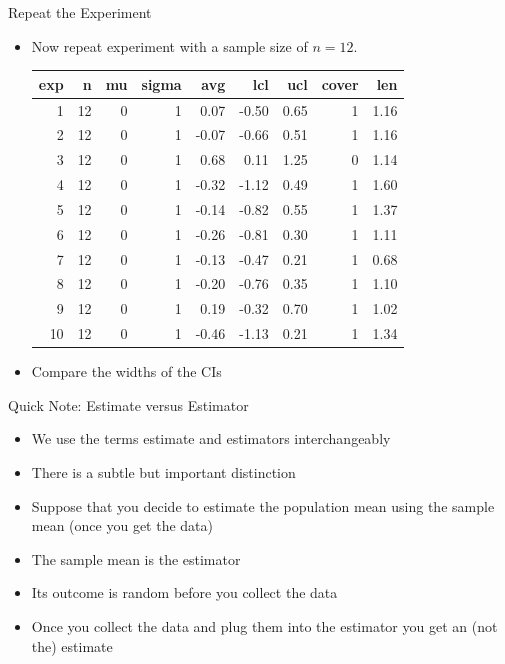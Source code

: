 \documentclass[xcolor=x11names,compress]{beamer}\usepackage[]{graphicx}\usepackage[]{color}
\newenvironment{knitrout}{}{} %
\begin{document}
\begin{frame}{Repeat the Experiment}

  
  \begin{itemize}
  \item Now repeat experiment with a sample size of
    $n=12$.
\begin{knitrout}\tiny
{}\color{fgcolor}
\begin{tabular}{r|r|r|r|r|r|r|r|r}
\hline
exp & n & mu & sigma & avg & lcl & ucl & cover & len\\
\hline
1 & 12 & 0 & 1 & 0.07 & -0.50 & 0.65 & 1 & 1.16\\
\hline
2 & 12 & 0 & 1 & -0.07 & -0.66 & 0.51 & 1 & 1.16\\
\hline
3 & 12 & 0 & 1 & 0.68 & 0.11 & 1.25 & 0 & 1.14\\
\hline
4 & 12 & 0 & 1 & -0.32 & -1.12 & 0.49 & 1 & 1.60\\
\hline
5 & 12 & 0 & 1 & -0.14 & -0.82 & 0.55 & 1 & 1.37\\
\hline
6 & 12 & 0 & 1 & -0.26 & -0.81 & 0.30 & 1 & 1.11\\
\hline
7 & 12 & 0 & 1 & -0.13 & -0.47 & 0.21 & 1 & 0.68\\
\hline
8 & 12 & 0 & 1 & -0.20 & -0.76 & 0.35 & 1 & 1.10\\
\hline
9 & 12 & 0 & 1 & 0.19 & -0.32 & 0.70 & 1 & 1.02\\
\hline
10 & 12 & 0 & 1 & -0.46 & -1.13 & 0.21 & 1 & 1.34\\
\hline
\end{tabular}


\end{knitrout}
\item Compare the widths of the CIs
\end{itemize}

\end{frame}


\begin{frame}{Quick Note: Estimate versus Estimator}
  \begin{itemize}
  \item We use the terms estimate and estimators interchangeably
  \item There is a subtle but important distinction
  \item Suppose that you decide to estimate the population mean using the sample mean (once you get the data)
  \item The sample mean is the estimator
  \item Its outcome is random before you collect the data
  \item Once you collect the data and plug them into the estimator you get an (not the) estimate
  \end{itemize}
\end{frame}
\end{document}
